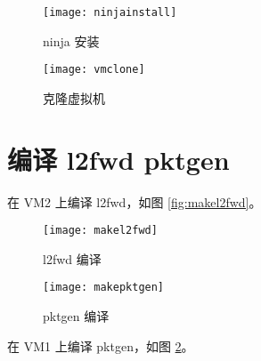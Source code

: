     \begin{figure}[H]
        \centering
        \begin{minipage}{0.45\textwidth}
            \centering
            \texttt{[image: ninjainstall]}
            \caption{ninja 安装}\label{fig:ninjainstall}
        \end{minipage}
        \begin{minipage}{0.3\textwidth}
            \centering
            \texttt{[image: vmclone]}
            \caption{克隆虚拟机}\label{fig:vmclone}
        \end{minipage}
    \end{figure}

    \section{编译 l2fwd pktgen}

    在 VM2 上编译 l2fwd，如图 \ref{fig:makel2fwd}。


    \begin{figure}[H]
        \centering
        \begin{minipage}{0.48\textwidth}
            \centering
            \texttt{[image: makel2fwd]}
            \caption{l2fwd 编译}\label{fig:makel2fwd}
        \end{minipage}
        \begin{minipage}{0.48\textwidth}
            \centering
            \texttt{[image: makepktgen]}
            \caption{pktgen 编译}\label{fig:makepktgen}
        \end{minipage}
    \end{figure}

    在 VM1 上编译 pktgen，如图 \ref{fig:makepktgen}。


    


